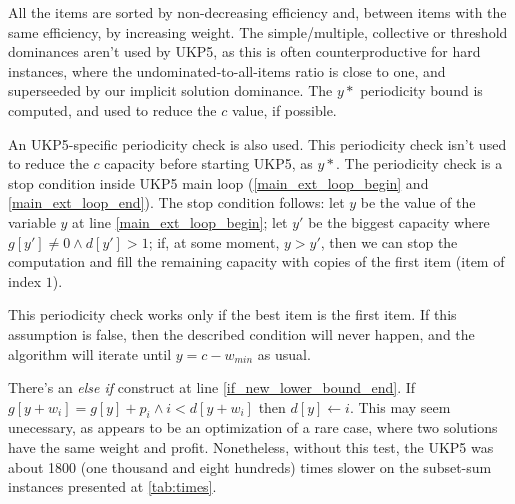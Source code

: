 \documentclass[runningheads,a4paper]{llncs}
\begin{document}
All the items are sorted by non-decreasing efficiency and, between items with the same efficiency, by increasing weight. The simple/multiple, collective or threshold dominances aren't used by UKP5, as this is often counterproductive for hard instances, where the undominated-to-all-items ratio is close to one, and superseeded by our implicit solution dominance. The \(y*\) periodicity bound is computed\cite[p. 223]{gar72}, and used to reduce the \(c\) value, if possible.

An UKP5-specific periodicity check is also used. This periodicity check isn't used to reduce the \(c\) capacity before starting UKP5, as \(y*\). The periodicity check is a stop condition inside UKP5 main loop (\ref{main_ext_loop_begin} and \ref{main_ext_loop_end}). The stop condition follows: let \(y\) be the value of the variable \(y\) at line \ref{main_ext_loop_begin}; let \(y'\) be the biggest capacity where \(g[y'] \neq 0 \land d[y'] > 1\); if, at some moment, \(y > y'\), then we can stop the computation and fill the remaining capacity with copies of the first item (item of index \(1\)).%


This periodicity check works only if the best item is the first item. If this assumption is false, then the described condition will never happen, and the algorithm will iterate until \(y = c - w_{min}\) as usual.

There's an \emph{else if} construct at line \ref{if_new_lower_bound_end}. If \(g[y + w_i] = g[y] + p_i \land i < d[y + w_i]\) then \(d[y] \gets i\). This may seem unecessary, as appears to be an optimization of a rare case, where two solutions have the same weight and profit. Nonetheless, without this test, the UKP5 was about 1800 (one thousand and eight hundreds) times slower on the subset-sum instances presented at \ref{tab:times}.
\end{document}
